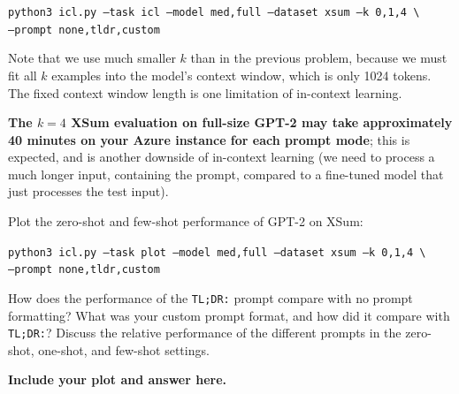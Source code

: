 \documentclass[12pt]{article}
\begin{document}
\begin{enumerate}
    \texttt{\small python3 icl.py --task icl --model med,full --dataset xsum --k 0,1,4 \textbackslash \\
    \phantom{asdf}--prompt none,tldr,custom}
    
    Note that we use much smaller $k$ than in the previous problem, because we must fit all $k$ examples into the model's context window, which is only 1024 tokens. The fixed context window length is one limitation of in-context learning.
    
    \textbf{The $k=4$ XSum evaluation on full-size GPT-2 may take approximately 40 minutes on your Azure instance for each prompt mode}; this is expected, and is another downside of in-context learning (we need to process a much longer input, containing the prompt, compared to a fine-tuned model that just processes the test input).
    
    Plot the zero-shot and few-shot performance of GPT-2 on XSum:
    
    \texttt{\small python3 icl.py --task plot --model med,full --dataset xsum --k 0,1,4 \textbackslash \\
    \phantom{asdf}--prompt none,tldr,custom}
    
    How does the performance of the \texttt{TL;DR:} prompt compare with no prompt formatting? What was your custom prompt format, and how did it compare with \texttt{TL;DR:}? Discuss the relative performance of the different prompts in the zero-shot, one-shot, and few-shot settings.
    
    \textbf{\color{red}Include your plot and answer here.}

\end{enumerate}
\end{document}
